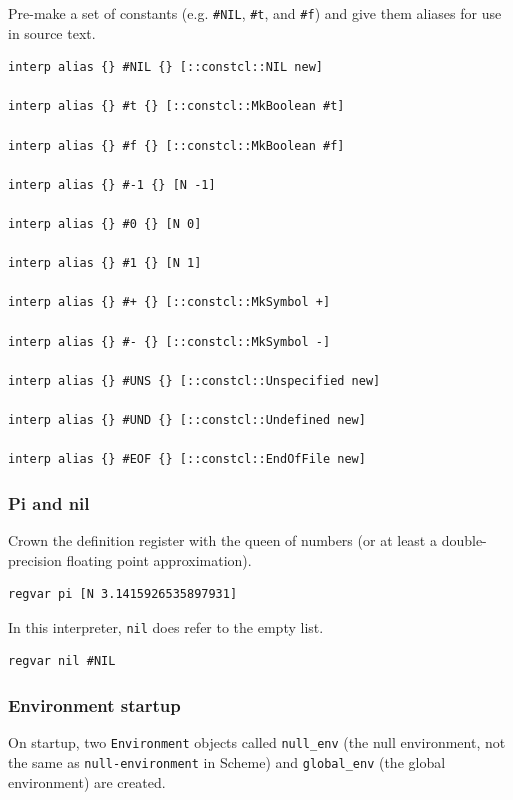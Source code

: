 \documentclass[twoside]{report}
\begin{document}
Pre-make a set of constants (e.g. \texttt{\#NIL}, \texttt{\#t}, and \texttt{\#f}) and give them aliases for use in source text.

\begin{lstlisting}
interp alias {} #NIL {} [::constcl::NIL new]

interp alias {} #t {} [::constcl::MkBoolean #t]

interp alias {} #f {} [::constcl::MkBoolean #f]

interp alias {} #-1 {} [N -1]

interp alias {} #0 {} [N 0]

interp alias {} #1 {} [N 1]

interp alias {} #+ {} [::constcl::MkSymbol +]

interp alias {} #- {} [::constcl::MkSymbol -]

interp alias {} #UNS {} [::constcl::Unspecified new]

interp alias {} #UND {} [::constcl::Undefined new]

interp alias {} #EOF {} [::constcl::EndOfFile new]
\end{lstlisting}

\subsubsection{Pi and nil}
\label{pi-and-nil}

Crown the definition register with the queen of numbers (or at least a double-precision floating point approximation).

\begin{lstlisting}
regvar pi [N 3.1415926535897931]
\end{lstlisting}

In this interpreter, \texttt{nil} does refer to the empty list.

\begin{lstlisting}
regvar nil #NIL
\end{lstlisting}

\subsubsection{Environment startup}
\label{environment-startup}

On startup, two \texttt{Environment} objects called \texttt{null\_env} (the null environment, not the same as \texttt{null-environment} in Scheme) and \texttt{global\_env} (the global environment) are created.
\end{document}
